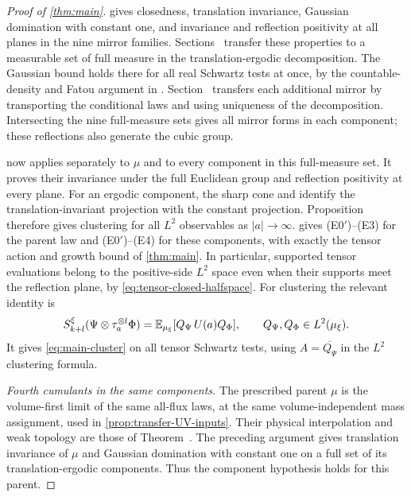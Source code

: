 \begin{proof}[Proof of \cref{thm:main}]
 gives closedness,
translation invariance, Gaussian domination with constant
one, and invariance and reflection positivity at all
planes in the nine mirror families.
Sections~ transfer
these properties to a measurable set of full measure
in the translation-ergodic decomposition.
The Gaussian bound holds there for all real Schwartz
tests at once, by the countable-density and Fatou
argument in .
Section~ transfers each additional mirror
by transporting the conditional laws and using
uniqueness of the decomposition. Intersecting the
nine full-measure sets gives all mirror forms in
each component; these reflections also generate
the cubic group.

 now applies
separately to $\mu$ and to every component in this
full-measure set. It proves their invariance under
the full Euclidean group and reflection positivity
at every plane.
For an ergodic component, the sharp cone and
 identify the
translation-invariant projection with the constant
projection. Proposition~
therefore gives clustering for all $L^2$ observables
as $|a|\to\infty$.
 gives
\textup{(E0$'$)}--\textup{(E3)} for the parent law and
\textup{(E0$'$)}--\textup{(E4)} for these components,
with exactly the tensor action and growth bound of
\cref{thm:main}.
In particular, supported tensor evaluations belong
to the positive-side $L^2$ space even when their
supports meet the reflection plane, by
\eqref{eq:tensor-closed-halfspace}.
For clustering the relevant identity is
\[
 S_{k+l}^\xi(\Psi\otimes\tau_a^{\otimes l}\Phi)
   =\mathbb E_{\mu_\xi}[Q_\Psi\,U(a)Q_\Phi],
                 \qquad Q_\Psi,Q_\Phi\in L^2(\mu_\xi).
\]
It gives \eqref{eq:main-cluster} on all tensor Schwartz
tests, using \(A=\overline{Q_\Psi}\) in the
$L^2$ clustering formula.

\emph{Fourth cumulants in the same components.}
The prescribed parent $\mu$ is the volume-first limit of the
same all-flux laws, at the same volume-independent mass assignment,
used in \cref{prop:transfer-UV-inputs}. Their physical interpolation
and weak topology are those of Theorem~.
The preceding argument gives translation invariance of $\mu$
and Gaussian domination with constant one on a full set of
its translation-ergodic components. Thus the component hypothesis
 holds for this parent.


\end{proof}
